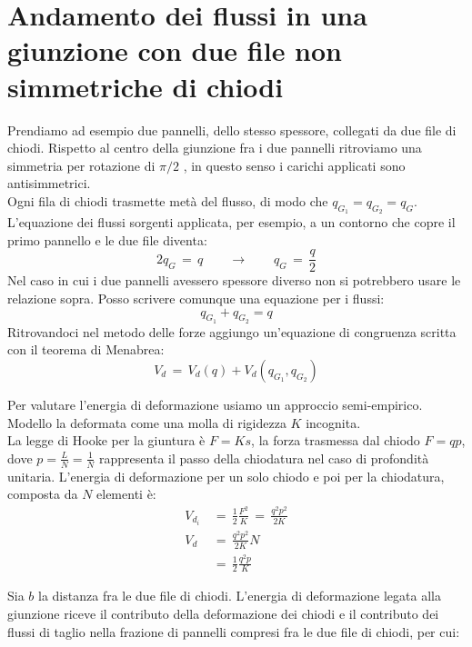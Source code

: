 \section{Andamento dei flussi in una giunzione con due file non simmetriche di chiodi}

Prendiamo ad esempio due pannelli, dello stesso spessore, collegati da due file di chiodi. Rispetto al centro della giunzione fra i due pannelli ritroviamo una simmetria per rotazione di $\pi/2$ , in questo senso i carichi applicati sono antisimmetrici.\\
Ogni fila di chiodi trasmette metà del flusso, di modo che $q_{G_1}=q_{G_2} = q_G$.\\
L'equazione dei flussi sorgenti applicata, per esempio, a un contorno che copre il primo pannello e le due file diventa:
\begin{equation*}
    2q_G\,=\,q  \qquad\rightarrow\qquad q_G\,=\,\frac{q}{2}
\end{equation*}
Nel caso in cui i due pannelli avessero spessore diverso non si potrebbero usare le relazione sopra. Posso scrivere comunque una equazione per i flussi:
\begin{equation*}
   q_{G_1}+q_{G_2} = q
\end{equation*}
Ritrovandoci nel metodo delle forze aggiungo un'equazione di congruenza scritta con il teorema di Menabrea:
\begin{equation*}
    V_d\,=\, V_d(q) +V_d(q_{G_1},q_{G_2} )
\end{equation*}

Per valutare l'energia di deformazione usiamo un approccio semi-empirico. Modello la deformata come una molla di rigidezza $K$ incognita.\\


La legge di Hooke per la giuntura è $F=Ks$, la forza trasmessa dal chiodo $F=qp$, dove $p=\frac{L}{N}=\frac{1}{N}$ rappresenta il passo della chiodatura nel caso di profondità unitaria. L'energia di deformazione per un solo chiodo e poi per la chiodatura, composta da $N$ elementi è:
\begin{align*}
    V_{d_i}\,&=\,\frac{1}{2}\frac{F^2}{K}\,=\,\frac{q^2p^2}{2K}\\
      V_{d}\,&=\,\frac{q^2p^2}{2K}N\\
            &= \,\frac{1}{2}\frac{q^2p}{K}\,
\end{align*}

Sia $b$ la distanza fra le due file di chiodi. L'energia di deformazione legata alla giunzione riceve il contributo della deformazione dei chiodi e il contributo dei flussi di taglio nella frazione di pannelli compresi fra le due file di chiodi, per cui:

